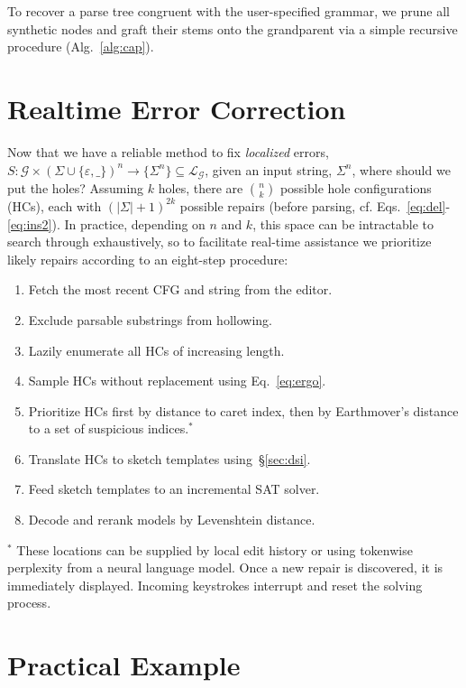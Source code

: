 \documentclass[sigplan,nonacm]{acmart}\settopmatter{printfolios=false,printccs=false,printacmref=false}
\begin{document}
\noindent To recover a parse tree congruent with the user-specified grammar, we prune all synthetic nodes and graft their stems onto the grandparent via a simple recursive procedure (Alg.~\ref{alg:cap}).%

\section{Realtime Error Correction}\label{sec:holes}

Now that we have a reliable method to fix \textit{localized} errors, $S: \mathcal{G} \times (\Sigma\cup\{\varepsilon, \texttt{\_}\})^n \rightarrow \{\Sigma^n\}\subseteq \mathcal{L}_\mathcal{G}$, given an input string, $\Sigma^n$, where should we put the holes? Assuming $k$ holes, there are ${n \choose k}$ possible hole configurations (HCs), each with $(|\Sigma| + 1)^{2k}$ possible repairs (before parsing, cf. Eqs.~\ref{eq:del}-\ref{eq:ins2}). In practice, depending on $n$ and $k$, this space can be intractable to search through exhaustively, so to facilitate real-time assistance we prioritize likely repairs according to an eight-step procedure:

\begin{enumerate}
  \item Fetch the most recent CFG and string from the editor.
  \item Exclude parsable substrings from hollowing.
  \item Lazily enumerate all HCs of increasing length.
  \item Sample HCs without replacement using Eq.~\ref{eq:ergo}.
  \item Prioritize HCs first by distance to caret index, then by Earthmover's distance to a set of suspicious indices.$^*$
  \item Translate HCs to sketch templates using~\S\ref{sec:dsi}.
  \item Feed sketch templates to an incremental SAT solver.
  \item Decode and rerank models by Levenshtein distance.
\end{enumerate}

\noindent $^*$ These locations can be supplied by local edit history or using tokenwise perplexity from a neural language model. Once a new repair is discovered, it is immediately displayed. Incoming keystrokes interrupt and reset the solving process.

\section{Practical Example}
\end{document}
